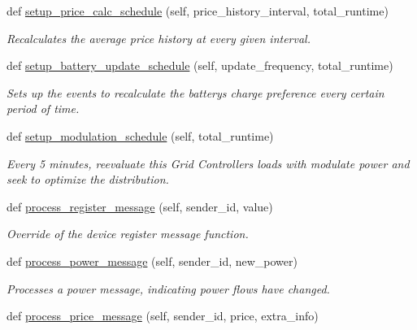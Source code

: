 \begin{DoxyCompactItemize}
def \hyperlink{class_build_1_1_objects_1_1grid__controller_1_1_grid_controller_a5dedc78f6eca0253e0395ca38c74c4b0}{setup\+\_\+price\+\_\+calc\+\_\+schedule} (self, price\+\_\+history\+\_\+interval, total\+\_\+runtime)
\begin{DoxyCompactList}\small\item\em Recalculates the average price history at every given interval. \end{DoxyCompactList}\item 
def \hyperlink{class_build_1_1_objects_1_1grid__controller_1_1_grid_controller_a03876bc3ddc4c92dfa5e80e74978169a}{setup\+\_\+battery\+\_\+update\+\_\+schedule} (self, update\+\_\+frequency, total\+\_\+runtime)
\begin{DoxyCompactList}\small\item\em Sets up the events to recalculate the battery\textquotesingle{}s charge preference every certain period of time. \end{DoxyCompactList}\item 
def \hyperlink{class_build_1_1_objects_1_1grid__controller_1_1_grid_controller_af818cf547695cc3dbb126112cac8f453}{setup\+\_\+modulation\+\_\+schedule} (self, total\+\_\+runtime)
\begin{DoxyCompactList}\small\item\em Every 5 minutes, reevaluate this Grid Controller\textquotesingle{}s loads with modulate power and seek to optimize the distribution. \end{DoxyCompactList}\item 
def \hyperlink{class_build_1_1_objects_1_1grid__controller_1_1_grid_controller_aedf7e56f24b97d1fa1d4ff68d23cd987}{process\+\_\+register\+\_\+message} (self, sender\+\_\+id, value)
\begin{DoxyCompactList}\small\item\em Override of the device register message function. \end{DoxyCompactList}\item 
def \hyperlink{class_build_1_1_objects_1_1grid__controller_1_1_grid_controller_a7a07bb8716ac48899b8f0c1ee2e2f6fe}{process\+\_\+power\+\_\+message} (self, sender\+\_\+id, new\+\_\+power)
\begin{DoxyCompactList}\small\item\em Processes a power message, indicating power flows have changed. \end{DoxyCompactList}\item 
def \hyperlink{class_build_1_1_objects_1_1grid__controller_1_1_grid_controller_a7133aa43a9d19e42fad9c6deca385fe2}{process\+\_\+price\+\_\+message} (self, sender\+\_\+id, price, extra\+\_\+info)

\end{DoxyCompactItemize}
